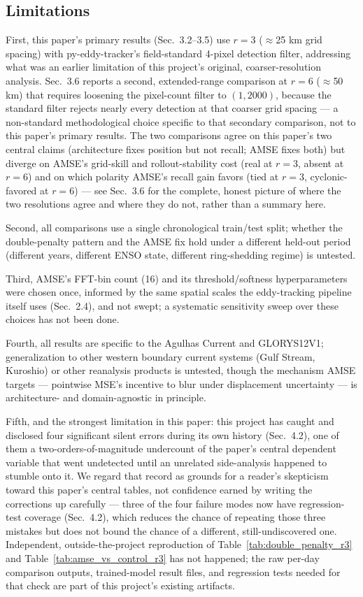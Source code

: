 \documentclass[11pt]{article}
\begin{document}
\subsection{Limitations}

First, this paper's primary results (Sec.~3.2--3.5) use $r=3$ ($\approx$25 km grid spacing) with py-eddy-tracker's field-standard 4-pixel detection filter, addressing what was an earlier limitation of this project's original, coarser-resolution analysis. Sec.~3.6 reports a second, extended-range comparison at $r=6$ ($\approx$50 km) that requires loosening the pixel-count filter to $(1, 2000)$, because the standard filter rejects nearly every detection at that coarser grid spacing --- a non-standard methodological choice specific to that secondary comparison, not to this paper's primary results. The two comparisons agree on this paper's two central claims (architecture fixes position but not recall; AMSE fixes both) but diverge on AMSE's grid-skill and rollout-stability cost (real at $r=3$, absent at $r=6$) and on which polarity AMSE's recall gain favors (tied at $r=3$, cyclonic-favored at $r=6$) --- see Sec.~3.6 for the complete, honest picture of where the two resolutions agree and where they do not, rather than a summary here.

Second, all comparisons use a single chronological train/test split; whether the double-penalty pattern and the AMSE fix hold under a different held-out period (different years, different ENSO state, different ring-shedding regime) is untested.

Third, AMSE's FFT-bin count (16) and its threshold/softness hyperparameters were chosen once, informed by the same spatial scales the eddy-tracking pipeline itself uses (Sec.~2.4), and not swept; a systematic sensitivity sweep over these choices has not been done.

Fourth, all results are specific to the Agulhas Current and GLORYS12V1; generalization to other western boundary current systems (Gulf Stream, Kuroshio) or other reanalysis products is untested, though the mechanism AMSE targets --- pointwise MSE's incentive to blur under displacement uncertainty --- is architecture- and domain-agnostic in principle.

Fifth, and the strongest limitation in this paper: this project has caught and disclosed four significant silent errors during its own history (Sec.~4.2), one of them a two-orders-of-magnitude undercount of the paper's central dependent variable that went undetected until an unrelated side-analysis happened to stumble onto it. We regard that record as grounds for a reader's skepticism toward this paper's central tables, not confidence earned by writing the corrections up carefully --- three of the four failure modes now have regression-test coverage (Sec.~4.2), which reduces the chance of repeating those three mistakes but does not bound the chance of a different, still-undiscovered one. Independent, outside-the-project reproduction of Table~\ref{tab:double_penalty_r3} and Table~\ref{tab:amse_vs_control_r3} has not happened; the raw per-day comparison outputs, trained-model result files, and regression tests needed for that check are part of this project's existing artifacts.
\end{document}
